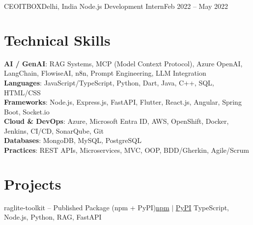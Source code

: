\documentclass[a4paper,10pt]{article}
\begin{document}
    \resumeSubheading
      {CEOITBOX}{Delhi, India}
      {Node.js Development Intern}{Feb 2022 -- May 2022}
      \resumeItemListStart
      \resumeItemListEnd

  \resumeSubHeadingListEnd

\section{Technical Skills}
 \begin{itemize}[leftmargin=0.15in, label={}]
    \small{\item{
     \textbf{AI / GenAI}{: RAG Systems, MCP (Model Context Protocol), Azure OpenAI, LangChain, FlowiseAI, n8n, Prompt Engineering, LLM Integration} \\
     \textbf{Languages}{: JavaScript/TypeScript, Python, Dart, Java, C++, SQL, HTML/CSS} \\
     \textbf{Frameworks}{: Node.js, Express.js, FastAPI, Flutter, React.js, Angular, Spring Boot, Socket.io} \\
     \textbf{Cloud \& DevOps}{: Azure, Microsoft Entra ID, AWS, OpenShift, Docker, Jenkins, CI/CD, SonarQube, Git} \\
     \textbf{Databases}{: MongoDB, MySQL, PostgreSQL} \\
     \textbf{Practices}{: REST APIs, Microservices, MVC, OOP, BDD/Gherkin, Agile/Scrum}
    }}
 \end{itemize}

\section{Projects}
  \resumeSubHeadingListStart

    \resumeSubheading
      {raglite-toolkit -- Published Package (npm + PyPI)}{\href{https://www.npmjs.com/package/raglite-toolkit}{npm} $|$ \href{https://pypi.org/project/raglite-toolkit/}{PyPI}}
      {TypeScript, Node.js, Python, RAG, FastAPI}{}
      \resumeItemListStart
      \resumeItemListEnd
\end{document}
